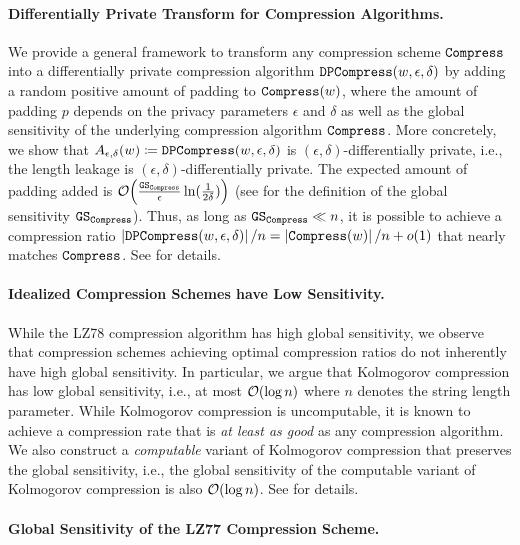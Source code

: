 \paragraph*{Differentially Private Transform for Compression Algorithms.}

 We provide a general framework to transform any compression scheme $\mathtt{Compress}$ into a differentially private compression algorithm $\mathtt{DPCompress}(w,\epsilon,\delta)$ by adding a random positive amount of padding to $\mathtt{Compress}(w)$, where the amount of padding $p$ depends on the privacy parameters $\epsilon$ and $\delta$ as well as the global sensitivity of the underlying compression algorithm $\mathtt{Compress}$. More concretely, we show that $A_{\epsilon,\delta}(w)\coloneqq\mathtt{DPCompress}(w,\epsilon,\delta)$ is $(\epsilon,\delta)$-differentially private, i.e., the length leakage is $(\epsilon,\delta)$-differentially private.  The expected amount of padding added is $\O{\frac{\GS_\compress}{\epsilon}\ln(\frac{1}{2\delta})}$ (see  for the definition of the global sensitivity $\mathtt{GS}_{\mathtt{Compress}}$). Thus, as long as  $\mathtt{GS}_{\mathtt{Compress}} \ll n$, it is possible to achieve a compression ratio $\left| \mathtt{DPCompress}(w,\epsilon,\delta) \right|/ n = \left| \mathtt{Compress}(w) \right|/ n + o(1)$ that nearly matches $\mathtt{Compress}$. See  for details.
 

\paragraph*{Idealized Compression Schemes have Low Sensitivity.}

While the LZ78 \cite{LZ78} compression algorithm has high global sensitivity, we observe that compression schemes achieving optimal compression ratios do not inherently have high global sensitivity. In particular, we argue that Kolmogorov compression has low global sensitivity, i.e., at most $\O{\log n}$ where $n$ denotes the string length parameter. While Kolmogorov compression is uncomputable, it is known to achieve a compression rate that is {\em at least as good} as any compression algorithm. We also construct a \emph{computable} variant of Kolmogorov compression that preserves the global sensitivity, i.e., the global sensitivity of the computable variant of Kolmogorov compression is also $\O{\log n}$.
See  for details.

\paragraph*{Global Sensitivity of the LZ77 Compression Scheme.}

